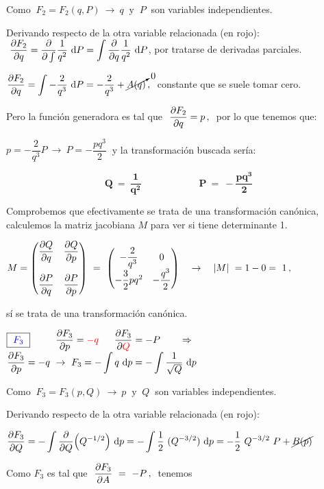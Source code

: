 Como $\ F_2=F_2(q,P) \ \to \ q \ \text{ y }  \ P \ $ son variables independientes.

Derivando respecto de la otra variable relacionada (en rojo): $ \ \displaystyle \pdv{F_2}{q}=\pdv \int \dfrac 1{q^2} \ \dd P = \int \pdv{q} \dfrac 1{q^2} \ \dd P $, por tratarse de derivadas parciales.

$\displaystyle \pdv{F_2}{q} = \int -\dfrac 2 {q^3} \ \dd P = -\dfrac 2 {q^3} + \cancelto{0}{A(q)}\, , \ $ constante que se suele tomar cero.

Pero la función generadora es tal que $\ \displaystyle \pdv{F_2}{q}=p\, , \ $ por lo que tenemos que:

$p=-\dfrac 2{q^3} P \ \to \ P=-\dfrac{pq^3}{2} \ $ y la transformación buscada sería:

$$\boldsymbol{ Q\ = \ \dfrac 1 {q^2} \qquad \qquad \qquad P \ = \ -\dfrac{pq^3}{2} }$$ 

\vspace{5mm} Comprobemos que efectivamente se trata de una transformación canónica, calculemos la matriz jacobiana $M$ para ver si tiene determinante 1.

$M=\mqty( \displaystyle \pdv{Q}{q} & \displaystyle \pdv{Q}{p} \\ \\ \displaystyle \pdv{P}{q} & \displaystyle \pdv{P}{p} ) \ = \ \mqty(-\dfrac{2} {q^3} & 0 \\ -\dfrac 3 2 pq^2 & -\dfrac{q^3}{2}) \quad \to \quad |M|\ = 1-0 = \ 1\, , \  $  

sí se trata de una transformación canónica.



\vspace{5mm} $\boxed{ \ \textcolor{blue}{F_3}  \ } \qquad  \
 \ \displaystyle \pdv{F_3}{p}=\textcolor{red}{-q} \; \
\quad  \pdv{F_3}{\textcolor{red}{Q}}= -P \qquad \Rightarrow 
\qquad $
$ \displaystyle \pdv{F_3}{p}=-q \ \to \ F_3=-\int q \ \dd p = -\int \dfrac 1 {	\sqrt
{Q}} \ \dd p$

Como $\ F_3=F_3(p,Q) \ \to \ p \ \text{ y }  \ Q \ $ son variables independientes.

Derivando respecto de la otra variable relacionada (en rojo):
 
 $\displaystyle \pdv{F_3}{Q}=-\int \pdv{Q} (Q^{-1/2})\ \dd p =- \int \dfrac 1 2 \ (Q^{-3/2}) \ \dd p = -\dfrac 1 2 \ Q^{-3/2} \ P +\cancel{B(p)}$
 
 Como $F_3$ es tal que $\ \displaystyle \pdv{F_3}{A} \ = \ - P \, , \ $ tenemos
 

